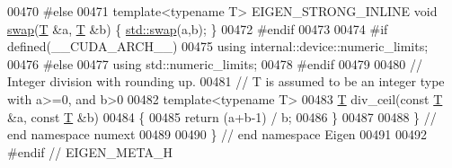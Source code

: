 \begin{DoxyCode}
00470 \textcolor{preprocessor}{#else}
00471 \textcolor{keyword}{template}<\textcolor{keyword}{typename} T> EIGEN\_STRONG\_INLINE \textcolor{keywordtype}{void} \hyperlink{endian_8c_a3ca5ecd34b04d6a243c054ac3a57f68d}{swap}(\hyperlink{group___sparse_core___module_class_eigen_1_1_triplet}{T} &a, \hyperlink{group___sparse_core___module_class_eigen_1_1_triplet}{T} &b) \{ \hyperlink{endian_8c_a3ca5ecd34b04d6a243c054ac3a57f68d}{std::swap}(a,b); \}
00472 \textcolor{preprocessor}{#endif}
00473 
00474 \textcolor{preprocessor}{#if defined(\_\_CUDA\_ARCH\_\_)}
00475 \textcolor{keyword}{using} internal::device::numeric\_limits;
00476 \textcolor{preprocessor}{#else}
00477 \textcolor{keyword}{using} std::numeric\_limits;
00478 \textcolor{preprocessor}{#endif}
00479 
00480 \textcolor{comment}{// Integer division with rounding up.}
00481 \textcolor{comment}{// T is assumed to be an integer type with a>=0, and b>0}
00482 \textcolor{keyword}{template}<\textcolor{keyword}{typename} T>
00483 \hyperlink{group___sparse_core___module_class_eigen_1_1_triplet}{T} div\_ceil(\textcolor{keyword}{const} \hyperlink{group___sparse_core___module_class_eigen_1_1_triplet}{T} &a, \textcolor{keyword}{const} \hyperlink{group___sparse_core___module_class_eigen_1_1_triplet}{T} &b)
00484 \{
00485   \textcolor{keywordflow}{return} (a+b-1) / b;
00486 \}
00487 
00488 \} \textcolor{comment}{// end namespace numext}
00489 
00490 \} \textcolor{comment}{// end namespace Eigen}
00491 
00492 \textcolor{preprocessor}{#endif // EIGEN\_META\_H}
\end{DoxyCode}
